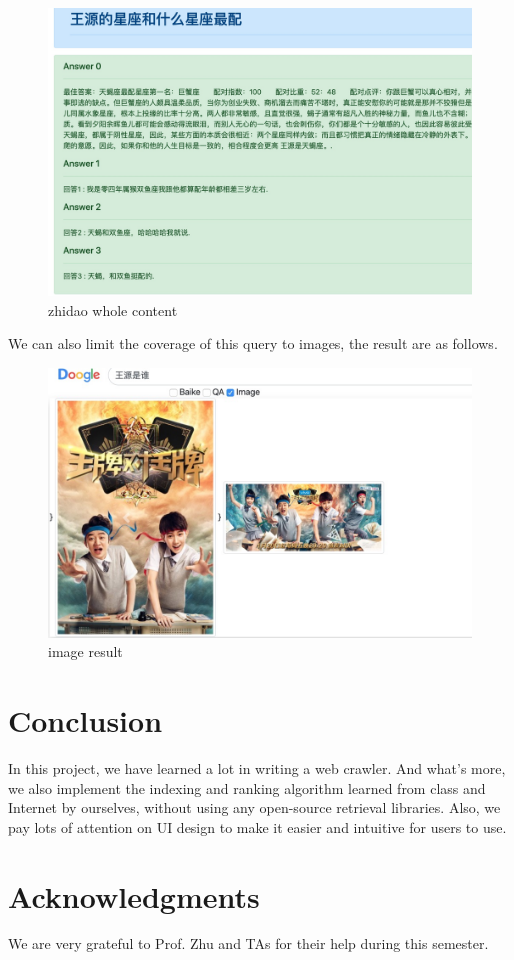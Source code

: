 \documentclass[10pt,times,twocolumn]{article}
\begin{document}
\begin{figure}[!h]
\centering
\includegraphics[scale=0.13]{fig/11}
\caption{zhidao whole content}
\label{fig:label}
\end{figure}
\newline
We can also limit the coverage of this query to images, the result are as follows.
\begin{figure}[h]
\centering
\includegraphics[scale=0.1]{fig/12}
\caption{image result}
\label{fig:label}
\end{figure}

\section{Conclusion}
In this project, we have learned a lot in writing a web crawler. And what's more, we also implement the indexing 
and ranking algorithm learned from class and Internet by ourselves, without using any open-source retrieval libraries. 
Also, we pay lots of attention on UI design to make it easier and intuitive for users to use.
\section{Acknowledgments}
We are very grateful to Prof. Zhu and TAs for their help during this semester. 

% 
% 
\end{document}
